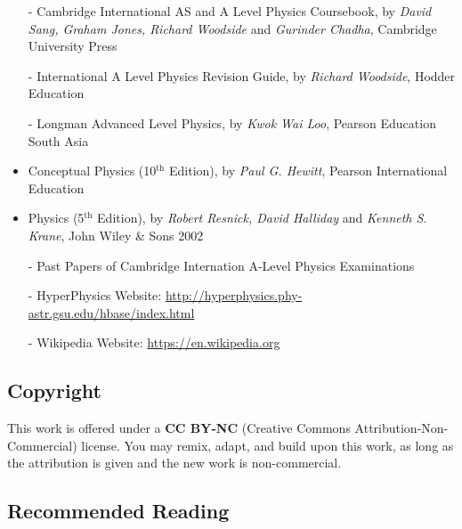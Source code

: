 \begin{itemize}
	\item[-] Cambridge International AS and A Level Physics Coursebook, by \textit{David Sang, Graham Jones, Richard Woodside} and \textit{Gurinder Chadha}, Cambridge University Press
	
	\item[-] International A Level Physics Revision Guide, by \textit{Richard Woodside}, Hodder Education
	
	\item[-] Longman Advanced Level Physics, by \textit{Kwok Wai Loo},	Pearson Education South Asia
	
	\item Conceptual Physics (10$^\text{th}$ Edition), by \textit{Paul G. Hewitt}, Pearson International Education
	
	\item Physics (5$^\text{th}$ Edition), by \textit{Robert Resnick, David Halliday} and \textit{Kenneth S. Krane}, John Wiley \& Sons 2002
	
	\item[-] Past Papers of Cambridge Internation A-Level Physics Examinations
	
	\item[-] HyperPhysics Website: \url{http://hyperphysics.phy-astr.gsu.edu/hbase/index.html}
	
	\item[-] Wikipedia Website: \url{https://en.wikipedia.org}
\end{itemize}

\subsection*{Copyright}

This work is offered under a \textbf{CC BY-NC} (Creative Commons Attribution-Non-Commercial) license. You may remix, adapt, and build upon this work, as long as the attribution is given and the new work is non-commercial.


\subsection*{Recommended Reading}
